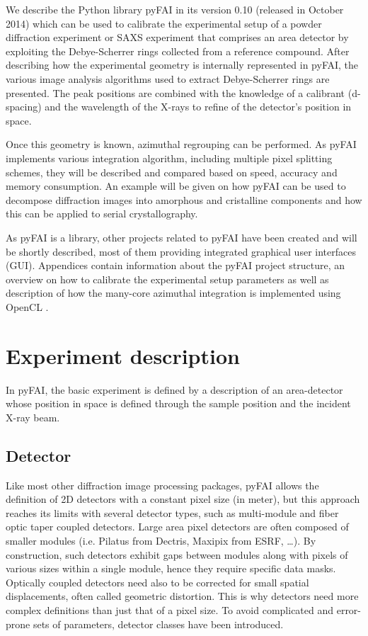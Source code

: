\documentclass[preprint]{iucr}
\begin{document}
We describe the Python library pyFAI in its version 0.10
(released in October 2014) which can be used to calibrate the experimental
setup of a powder diffraction experiment or SAXS experiment that comprises
an area detector by exploiting the Debye-Scherrer rings collected from a
reference compound.
After describing how the experimental geometry is internally represented in
pyFAI, the various image analysis algorithms used to extract Debye-Scherrer
rings are presented.
The peak positions are combined with the knowledge of a calibrant (d-spacing)
and the wavelength of the X-rays  to refine of the detector's position in space.

Once this geometry is known, azimuthal regrouping can be performed.
As pyFAI implements various integration algorithm, including
multiple pixel splitting schemes, they will be described and compared
based on speed, accuracy and memory consumption.
An example will be given on how pyFAI can be used to decompose
diffraction images into amorphous and cristalline components and how this can be
applied to serial crystallography.

As pyFAI is a library, other projects related to pyFAI have been created and
will be shortly described, most of them providing integrated
graphical user interfaces (GUI).
Appendices contain information about the pyFAI project structure, an
overview on how to calibrate the experimental setup parameters as well as
description of how the many-core azimuthal integration is implemented using
OpenCL \cite{opencl}.

\section{Experiment description}

In pyFAI, the basic experiment is defined by a description of an area-detector whose
position in space is defined through the sample position and the incident X-ray
beam.

\subsection{Detector}
Like most other diffraction image processing packages, pyFAI allows the definition of
2D detectors with a constant pixel size (in meter), but this approach reaches its limits
with several detector types, such as multi-module and fiber optic taper coupled detectors.
Large area pixel detectors are often composed of smaller modules (i.e. Pilatus
from Dectris, Maxipix from ESRF,
\ldots).
By construction, such detectors exhibit gaps between modules along with
pixels of various sizes within a single module, hence they require specific
data masks.
Optically coupled detectors need also to be corrected
for small spatial displacements, often called geometric distortion.
This is why detectors need more complex definitions than just that of a pixel
size.
To avoid complicated and error-prone sets of parameters, detector classes have
been introduced.
\end{document}
